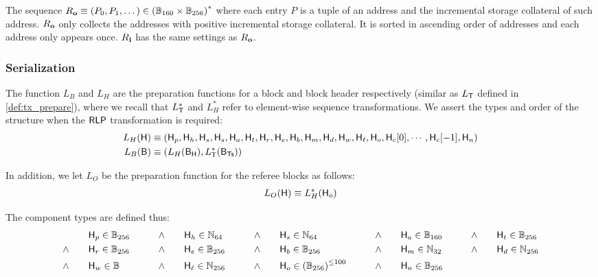 The sequence $R_{\bf o}\equiv \left(P_0,P_1,\dots\right) \in \left(\mathbb{B}_{160} \times \mathbb{B}_{256}\right)^*$ where each entry $P$ is a tuple of an address and the incremental storage collateral of such address. $R_{\bf o}$ only collects the addresses with positive incremental storage collateral. It is sorted in ascending order of addresses and each address only appears once. $R_{\bf i}$ has the same settings as $R_{\bf o}$.

\subsubsection{Serialization}

The function $L_B$ and $L_H$ are the preparation functions for a block and block header respectively (similar as $L_{\textsf{T}}$ defined in \cref{def:tx_prepare}),
where we recall that $L_{\textsf{T}}^*$ and $L_H^*$ refer to element-wise sequence transformations.
We assert the types and order of the structure when the $\mathsf{RLP}$ transformation is required:
%
\begin{align}
	L_H(\textsf{H}) &\equiv \left(\textsf{H}_p,\textsf{H}_h,\textsf{H}_s,\textsf{H}_s,\textsf{H}_a,\textsf{H}_t,\textsf{H}_r,\textsf{H}_e,\textsf{H}_b,\textsf{H}_m,\textsf{H}_d,\textsf{H}_w,\textsf{H}_\ell,\textsf{H}_o,\textsf{H}_c[0],\cdots,\textsf{H}_c[-1],\textsf{H}_n\right)\\
	L_B(\textsf{B}) &\equiv \left( L_H(\textsf{B}_{\textsf{H}}), L_{\textsf{T}}^*(\textsf{B}_{\textsf{Ts}}) \right)
\end{align}

In addition, we let $L_O$ be the preparation function for the referee blocks as follows:
\begin{align*}
	L_O(\textsf{H})\equiv L_H^*(\textsf{H}_o)
\end{align*}

The component types are defined thus: 
\begin{align}
	& \head_p \in \B_{256} 
	\qquad &\land \qquad &\head_h\in \N_{64}
	\qquad &\land \qquad &\head_s\in \N_{64}
	\qquad &\land \qquad &\head_a\in \B_{160}
	\qquad &\land \qquad &\head_t\in \B_{256}
	\notag\\
	\land \qquad &\head_r\in \B_{256}
	\qquad & \land \qquad &\head_e\in \B_{256}
	\qquad &\land \qquad &\head_b\in \B_{256} 
	\qquad &\land \qquad &\head_m\in \N_{32}	
	\qquad &\land \qquad &\head_d\in \N_{256}	
	\notag\\
	\land \qquad &\head_w\in \B
	\qquad &\land \qquad &\head_\ell\in \N_{256}	%
	\qquad &\land \qquad &\head_{o} \in\left(\B_{256}\right)^{\le \numberofommers}
	\qquad &\land \qquad &\head_n\in \B_{256}
\end{align}

